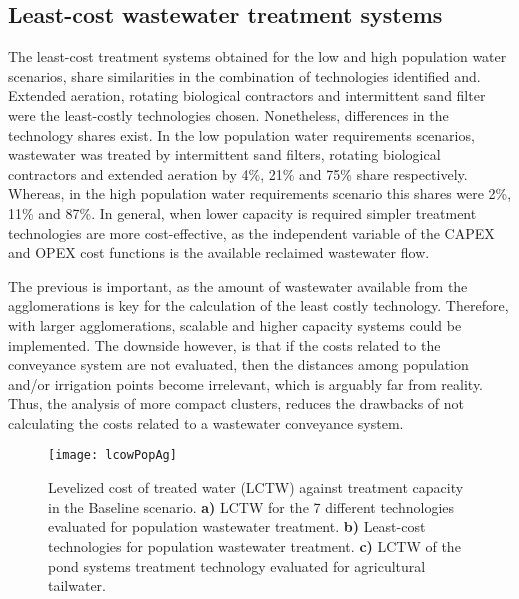 \subsection{Least-cost wastewater treatment systems}
The least-cost treatment systems obtained for the low and high population water scenarios, share similarities in the combination of technologies identified and. Extended aeration, rotating biological contractors and intermittent sand filter were the least-costly technologies chosen. Nonetheless, differences in the technology shares exist. In the low population water requirements scenarios, wastewater was treated by intermittent sand filters, rotating biological contractors and extended aeration by 4\%, 21\% and 75\% share respectively. Whereas, in the high population water requirements scenario this shares were 2\%, 11\% and 87\%. In general, when lower capacity is required simpler treatment technologies are more cost-effective, as the independent variable of the CAPEX and OPEX cost functions is the available reclaimed wastewater flow.



The previous is important, as the amount of wastewater available from the agglomerations is key for the calculation of the least costly technology. Therefore, with larger agglomerations, scalable and higher capacity systems could be implemented. The downside however, is that if the costs related to the conveyance system are not evaluated, then the distances among population and/or irrigation points become irrelevant, which is arguably far from reality. Thus, the analysis of more compact clusters, reduces the drawbacks of not calculating the costs related to a wastewater conveyance system.

\begin{figure*}[!t]
	\centering
	\texttt{[image: lcowPopAg]}
	\caption{Levelized cost of treated water (LCTW) against treatment capacity in the Baseline scenario. \textbf{a)} LCTW for the 7 different technologies evaluated for population wastewater treatment. \textbf{b)} Least-cost technologies for population wastewater treatment. \textbf{c)} LCTW of the pond systems treatment technology evaluated for agricultural tailwater.}
	\label{fig:lcowbaseline}
\end{figure*}

